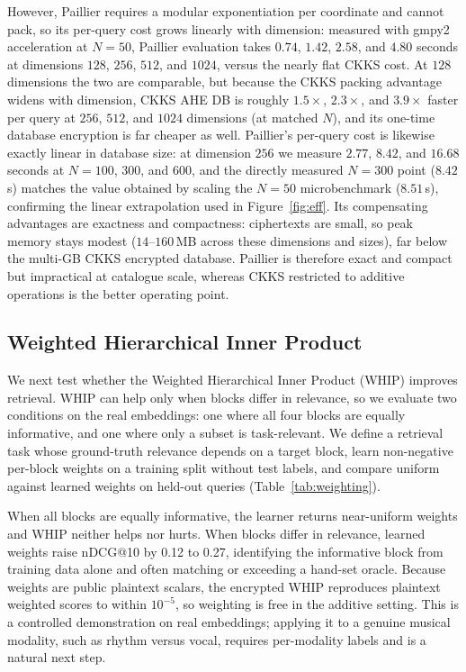 \documentclass[sigconf,nonacm]{acmart}
\begin{document}
However, Paillier requires a modular exponentiation per coordinate and cannot pack, so its per-query cost grows linearly with dimension: measured with gmpy2 acceleration at $N{=}50$, Paillier evaluation takes $0.74$, $1.42$, $2.58$, and $4.80$ seconds at dimensions $128$, $256$, $512$, and $1024$, versus the nearly flat CKKS cost. At $128$ dimensions the two are comparable, but because the CKKS packing advantage widens with dimension, CKKS AHE DB is roughly $1.5\times$, $2.3\times$, and $3.9\times$ faster per query at $256$, $512$, and $1024$ dimensions (at matched $N$), and its one-time database encryption is far cheaper as well. Paillier's per-query cost is likewise exactly linear in database size: at dimension $256$ we measure $2.77$, $8.42$, and $16.68$ seconds at $N{=}100$, $300$, and $600$, and the directly measured $N{=}300$ point ($8.42$\,s) matches the value obtained by scaling the $N{=}50$ microbenchmark ($8.51$\,s), confirming the linear extrapolation used in Figure~\ref{fig:eff}. Its compensating advantages are exactness and compactness: ciphertexts are small, so peak memory stays modest ($14$--$160$\,MB across these dimensions and sizes), far below the multi-GB CKKS encrypted database. Paillier is therefore exact and compact but impractical at catalogue scale, whereas CKKS restricted to additive operations is the better operating point.

\subsection{Weighted Hierarchical Inner Product}
\label{sec:weighting}
We next test whether the Weighted Hierarchical Inner Product (WHIP) improves retrieval. WHIP can help only when blocks differ in relevance, so we evaluate two conditions on the real embeddings: one where all four blocks are equally informative, and one where only a subset is task-relevant. We define a retrieval task whose ground-truth relevance depends on a target block, learn non-negative per-block weights on a training split without test labels, and compare uniform against learned weights on held-out queries (Table~\ref{tab:weighting}).

When all blocks are equally informative, the learner returns near-uniform weights and WHIP neither helps nor hurts. When blocks differ in relevance, learned weights raise nDCG@10 by 0.12 to 0.27, identifying the informative block from training data alone and often matching or exceeding a hand-set oracle. Because weights are public plaintext scalars, the encrypted WHIP reproduces plaintext weighted scores to within $10^{-5}$, so weighting is free in the additive setting. This is a controlled demonstration on real embeddings; applying it to a genuine musical modality, such as rhythm versus vocal, requires per-modality labels and is a natural next step.
\end{document}
